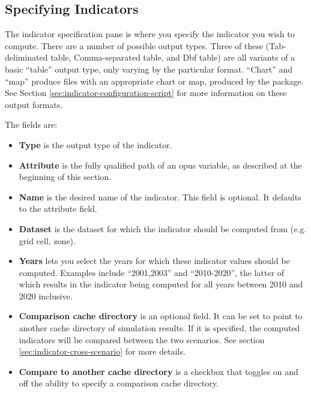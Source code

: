 \subsection{Specifying Indicators}

The indicator specification pane is where you specify the indicator you
wish to compute. There are a number of possible output types.  Three of
these (Tab-deliminated table, Comma-separated table, and Dbf table) are all
variants of a basic ``table'' output type, only varying by the particular
format.  ``Chart'' and ``map'' produce  files with an
appropriate chart or map, produced by the  package.
See Section \ref{sec:indicator-configuration-script}
for more information on these output formats.

The fields are:

\begin{itemize}
\tight
\item {\bf Type} is the output type of the indicator.

\item {\bf Attribute} is the fully qualified path of an opus variable, as 
described at the beginning of this section. 

\item {\bf Name} is the desired name of the indicator. This field is optional.
It defaults to the attribute field.

\item {\bf Dataset} is the dataset for which the indicator should be 
computed from (e.g. grid cell, zone).

\item {\bf Years} lets you select the years for
which these indicator values should be computed. Examples include
``2001,2003'' and ``2010-2020'', the latter of which results in 
the indicator being computed for all years between 2010 and 2020
inclusive. 

\item {\bf Comparison cache directory} is an optional field. It can 
be set to point to another cache directory of simulation results.
If it is specified, the computed indicators will be compared 
between the two scenarios. See section \ref{sec:indicator-cross-scenario} 
for more details. 

\item {\bf Compare to another cache directory} is a checkbox that toggles
on and off the ability to specify a comparison cache directory.

\end{itemize}

